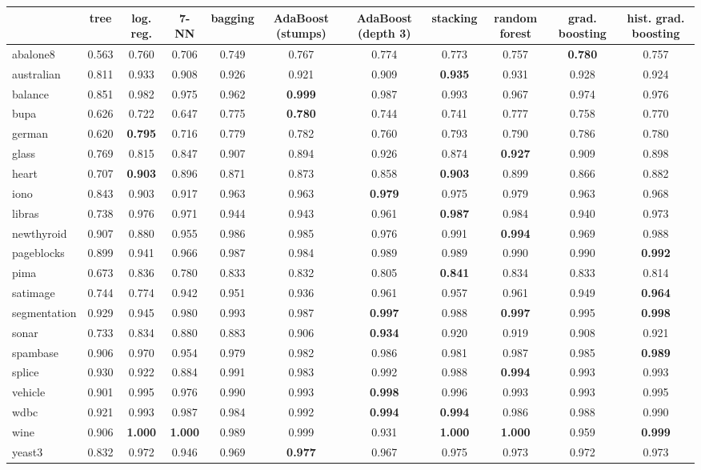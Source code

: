 \begin{tabular}{lcccccccccc}
\toprule
 & tree & log. reg. & 7-NN & bagging & AdaBoost (stumps) & AdaBoost (depth 3) & stacking & random forest & grad. boosting & hist. grad. boosting \\
\midrule
abalone8 & 0.563 & 0.760 & 0.706 & 0.749 & 0.767 & 0.774 & 0.773 & 0.757 & \textbf{0.780} & 0.757 \\
australian & 0.811 & 0.933 & 0.908 & 0.926 & 0.921 & 0.909 & \textbf{0.935} & 0.931 & 0.928 & 0.924 \\
balance & 0.851 & 0.982 & 0.975 & 0.962 & \textbf{0.999} & 0.987 & 0.993 & 0.967 & 0.974 & 0.976 \\
bupa & 0.626 & 0.722 & 0.647 & 0.775 & \textbf{0.780} & 0.744 & 0.741 & 0.777 & 0.758 & 0.770 \\
german & 0.620 & \textbf{0.795} & 0.716 & 0.779 & 0.782 & 0.760 & 0.793 & 0.790 & 0.786 & 0.780 \\
glass & 0.769 & 0.815 & 0.847 & 0.907 & 0.894 & 0.926 & 0.874 & \textbf{0.927} & 0.909 & 0.898 \\
heart & 0.707 & \textbf{0.903} & 0.896 & 0.871 & 0.873 & 0.858 & \textbf{0.903} & 0.899 & 0.866 & 0.882 \\
iono & 0.843 & 0.903 & 0.917 & 0.963 & 0.963 & \textbf{0.979} & 0.975 & 0.979 & 0.963 & 0.968 \\
libras & 0.738 & 0.976 & 0.971 & 0.944 & 0.943 & 0.961 & \textbf{0.987} & 0.984 & 0.940 & 0.973 \\
newthyroid & 0.907 & 0.880 & 0.955 & 0.986 & 0.985 & 0.976 & 0.991 & \textbf{0.994} & 0.969 & 0.988 \\
pageblocks & 0.899 & 0.941 & 0.966 & 0.987 & 0.984 & 0.989 & 0.989 & 0.990 & 0.990 & \textbf{0.992} \\
pima & 0.673 & 0.836 & 0.780 & 0.833 & 0.832 & 0.805 & \textbf{0.841} & 0.834 & 0.833 & 0.814 \\
satimage & 0.744 & 0.774 & 0.942 & 0.951 & 0.936 & 0.961 & 0.957 & 0.961 & 0.949 & \textbf{0.964} \\
segmentation & 0.929 & 0.945 & 0.980 & 0.993 & 0.987 & \textbf{0.997} & 0.988 & \textbf{0.997} & 0.995 & \textbf{0.998} \\
sonar & 0.733 & 0.834 & 0.880 & 0.883 & 0.906 & \textbf{0.934} & 0.920 & 0.919 & 0.908 & 0.921 \\
spambase & 0.906 & 0.970 & 0.954 & 0.979 & 0.982 & 0.986 & 0.981 & 0.987 & 0.985 & \textbf{0.989} \\
splice & 0.930 & 0.922 & 0.884 & 0.991 & 0.983 & 0.992 & 0.988 & \textbf{0.994} & 0.993 & 0.993 \\
vehicle & 0.901 & 0.995 & 0.976 & 0.990 & 0.993 & \textbf{0.998} & 0.996 & 0.993 & 0.993 & 0.995 \\
wdbc & 0.921 & 0.993 & 0.987 & 0.984 & 0.992 & \textbf{0.994} & \textbf{0.994} & 0.986 & 0.988 & 0.990 \\
wine & 0.906 & \textbf{1.000} & \textbf{1.000} & 0.989 & 0.999 & 0.931 & \textbf{1.000} & \textbf{1.000} & 0.959 & \textbf{0.999} \\
yeast3 & 0.832 & 0.972 & 0.946 & 0.969 & \textbf{0.977} & 0.967 & 0.975 & 0.973 & 0.972 & 0.973 \\
\bottomrule
\end{tabular}
